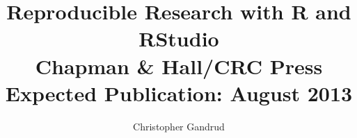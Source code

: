 \documentclass[krantz1]{krantz}
\begin{document}
\title{Reproducible Research with R and RStudio \\[2cm] {\large{Chapman \& Hall/CRC Press}} \\ {\normalsize{Expected Publication: August 2013}}}
\author{Christopher Gandrud}

\maketitle

\pagestyle{fancy}


\end{document}
